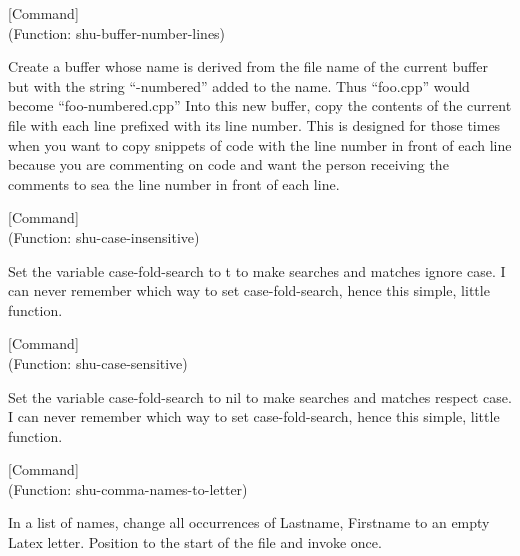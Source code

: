 \vspace{1em}
\noindent
{}
\usebox{\funcname}
 \hfill [Command]\\%
 (Function: shu-buffer-number-lines)

\begin{doc-string}
Create a buffer whose name is derived from the file name of the current
buffer but with the string ``-numbered'' added to the name.  Thus ``foo.cpp''
would become ``foo-numbered.cpp'' Into this new buffer, copy the contents of the
current file with each line prefixed with its line number.  This is designed for
those times when you want to copy snippets of code with the line number in front
of each line because you are commenting on code and want the person receiving
the comments to sea the line number in front of each line.
\end{doc-string}

\vspace{1em}
\noindent
{}
\usebox{\funcname}
 \hfill [Command]\\%
 (Function: shu-case-insensitive)

\begin{doc-string}
Set the variable case-fold-search to t to make searches and matches ignore
case.  I can never remember which way to set case-fold-search, hence this
simple, little function.
\end{doc-string}

\vspace{1em}
\noindent
{}
\usebox{\funcname}
 \hfill [Command]\\%
 (Function: shu-case-sensitive)

\begin{doc-string}
Set the variable case-fold-search to nil to make searches and matches respect
case.  I can never remember which way to set case-fold-search, hence this
simple, little function.
\end{doc-string}

\vspace{1em}
\noindent
{}
\usebox{\funcname}
 \hfill [Command]\\%
 (Function: shu-comma-names-to-letter)

\begin{doc-string}
In a list of names, change all occurrences
of Lastname, Firstname to an empty Latex letter.
Position to the start of the file and invoke once.
\end{doc-string}

